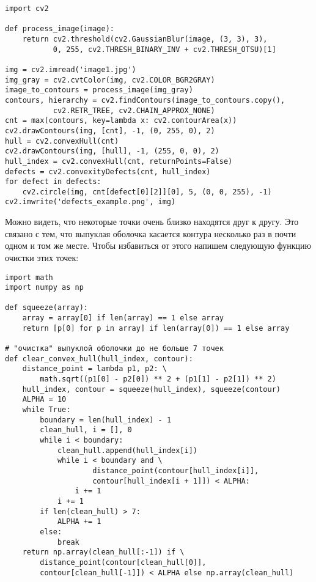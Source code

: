\begin{verbatim}
import cv2

def process_image(image):
    return cv2.threshold(cv2.GaussianBlur(image, (3, 3), 3), 
           0, 255, cv2.THRESH_BINARY_INV + cv2.THRESH_OTSU)[1]

img = cv2.imread('image1.jpg')
img_gray = cv2.cvtColor(img, cv2.COLOR_BGR2GRAY)
image_to_contours = process_image(img_gray)
contours, hierarchy = cv2.findContours(image_to_contours.copy(),
           cv2.RETR_TREE, cv2.CHAIN_APPROX_NONE)
cnt = max(contours, key=lambda x: cv2.contourArea(x))     
cv2.drawContours(img, [cnt], -1, (0, 255, 0), 2)
hull = cv2.convexHull(cnt)
cv2.drawContours(img, [hull], -1, (255, 0, 0), 2)
hull_index = cv2.convexHull(cnt, returnPoints=False)
defects = cv2.convexityDefects(cnt, hull_index)
for defect in defects:
    cv2.circle(img, cnt[defect[0][2]][0], 5, (0, 0, 255), -1)
cv2.imwrite('defects_example.png', img)
\end{verbatim}


Можно видеть, что некоторые точки очень близко находятся друг к другу.
Это связано с тем, что выпуклая оболочка касается контура 
несколько раз в почти одном и том же месте. Чтобы избавиться от
этого напишем следующую функцию очистки этих точек:

\begin{verbatim}
import math
import numpy as np

def squeeze(array):
    array = array[0] if len(array) == 1 else array
    return [p[0] for p in array] if len(array[0]) == 1 else array

# "очистка" выпуклой оболочки до не больше 7 точек
def clear_convex_hull(hull_index, contour):
    distance_point = lambda p1, p2: \
    	math.sqrt((p1[0] - p2[0]) ** 2 + (p1[1] - p2[1]) ** 2)
    hull_index, contour = squeeze(hull_index), squeeze(contour)
    ALPHA = 10
    while True:
        boundary = len(hull_index) - 1
        clean_hull, i = [], 0
        while i < boundary:
            clean_hull.append(hull_index[i])
            while i < boundary and \
                    distance_point(contour[hull_index[i]],
                    contour[hull_index[i + 1]]) < ALPHA:
                i += 1
            i += 1
        if len(clean_hull) > 7:
            ALPHA += 1
        else:
            break
    return np.array(clean_hull[:-1]) if \
        distance_point(contour[clean_hull[0]],
        contour[clean_hull[-1]]) < ALPHA else np.array(clean_hull)
\end{verbatim}

